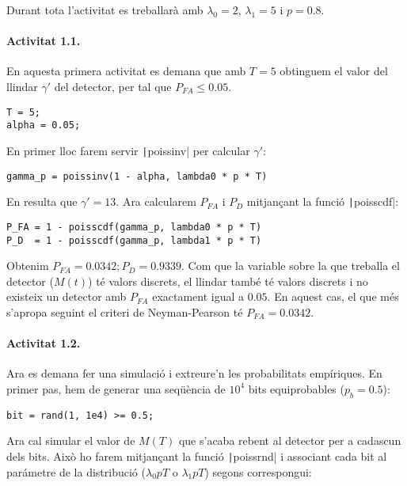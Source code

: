 \documentclass[catalan]{scrartcl}
\begin{document}
Durant tota l’activitat es treballarà amb $\lambda_0 = 2$, $\lambda_1 = 5$
i $p = 0.8$.

\paragraph{Activitat 1.1.}

En aquesta primera activitat es demana que amb $T = 5$ obtinguem el valor
del llindar $\gamma'$ del detector, per tal que $P_{FA} \leq 0.05$.

\begin{verbatim}
T = 5;
alpha = 0.05;
\end{verbatim}

En primer lloc farem servir \texttt|poissinv| per calcular
$\gamma'$:

\begin{verbatim}
gamma_p = poissinv(1 - alpha, lambda0 * p * T)
\end{verbatim}

En resulta que $\gamma' = 13$. Ara calcularem $P_{FA}$ i $P_D$ mitjançant
la funció \texttt|poisscdf|:

\begin{verbatim}
P_FA = 1 - poisscdf(gamma_p, lambda0 * p * T)
P_D  = 1 - poisscdf(gamma_p, lambda1 * p * T)
\end{verbatim}

Obtenim $P_{FA} = 0.0342; P_D = 0.9339$. Com que la variable sobre la que
treballa el detector ($M(t)$) té valors discrets, el llindar també té valors
discrets i no existeix un detector amb $P_{FA}$ exactament igual a $0.05$.
En aquest cas, el que més s'apropa seguint el criteri de Neyman-Pearson té
$P_{FA} = 0.0342$.

\paragraph{Activitat 1.2.}

Ara es demana fer una simulació i extreure'n les probabilitats empíriques.
En primer pas, hem de generar una seqüència de $10^4$ bits equiprobables
($p_b = 0.5$):

\begin{verbatim}
bit = rand(1, 1e4) >= 0.5;
\end{verbatim}

Ara cal simular el valor de $M(T)$ que s'acaba rebent al detector per a
cadascun dels bits. Això ho farem mitjançant la funció
\texttt|poissrnd| i associant cada bit al parámetre
de la distribució ($\lambda_0pT$ o $\lambda_1pT$) segons correspongui:
\end{document}

